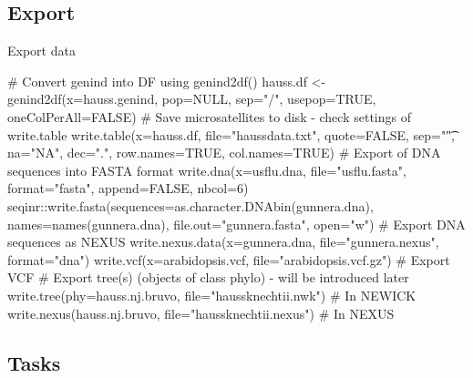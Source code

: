 \documentclass[compress, xelatex, 11pt, xcolor=svgnames, aspectratio=169,
	hyperref={
		bookmarks=true,
		unicode=true,
		colorlinks=true,
		pdftitle={Molecular data in R},
		plainpages=false,
		pdfauthor={Vojtech Zeisek},
		pdfsubject={Course about phylogeny and evolution in R},
		pdfcreator={XeLaTeX},
		pdfkeywords={R, evolution, phylogeny, molecular data},
		linkcolor=Crimson, %
		anchorcolor=Magenta, %
		citecolor=Magenta, %
		filecolor=Magenta, %
		menucolor=Magenta, %
		urlcolor=DodgerBlue, %
		},
	url={hyphens, lowtilde} %
	]{beamer}
\begin{document}
\subsection{Export}

\begin{frame}[fragile]{Export data}
	\begin{spluscode}
    # Convert genind into DF using genind2df()
    hauss.df <- genind2df(x=hauss.genind, pop=NULL, sep="/",
      usepop=TRUE, oneColPerAll=FALSE)
    # Save microsatellites to disk - check settings of write.table
    write.table(x=hauss.df, file="haussdata.txt", quote=FALSE,
      sep="\t", na="NA", dec=".", row.names=TRUE, col.names=TRUE)
    # Export of DNA sequences into FASTA format
    write.dna(x=usflu.dna, file="usflu.fasta", format="fasta",
      append=FALSE, nbcol=6)
    seqinr::write.fasta(sequences=as.character.DNAbin(gunnera.dna),
      names=names(gunnera.dna), file.out="gunnera.fasta", open="w")
    # Export DNA sequences as NEXUS
    write.nexus.data(x=gunnera.dna, file="gunnera.nexus", format="dna")
    write.vcf(x=arabidopsis.vcf, file="arabidopsis.vcf.gz") # Export VCF
    # Export tree(s) (objects of class phylo) - will be introduced later
    write.tree(phy=hauss.nj.bruvo, file="haussknechtii.nwk") # In NEWICK
    write.nexus(hauss.nj.bruvo, file="haussknechtii.nexus") # In NEXUS
	\end{spluscode}
\end{frame}

\subsection{Tasks}
\end{document}
